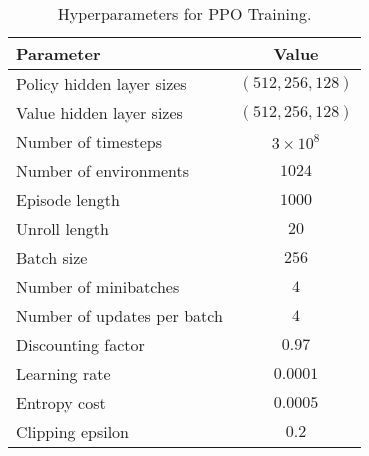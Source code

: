 \begin{table}[t]
\centering
\caption{Hyperparameters for PPO Training.}
\setlength{\tabcolsep}{7pt}
\begin{threeparttable}
\begin{tabular}{lc}
\toprule
\textbf{Parameter} & \textbf{Value} \\ 
\midrule
Policy hidden layer sizes & $(512, 256, 128)$ \\ 
Value hidden layer sizes & $(512, 256, 128)$ \\ 
Number of timesteps & $3\times10^8$ \\ 
Number of environments & $1024$ \\ 
Episode length & $1000$ \\ 
Unroll length & $20$ \\ 
Batch size & $256$ \\ 
Number of minibatches & $4$ \\ 
Number of updates per batch & $4$ \\ 
Discounting factor & $0.97$ \\ 
Learning rate & $0.0001$ \\ 
Entropy cost & $0.0005$ \\ 
Clipping epsilon & $0.2$ \\ 
\bottomrule
\end{tabular}
\end{threeparttable}
\label{tab:hyperparameters}
\vspace{-1mm}
\end{table}